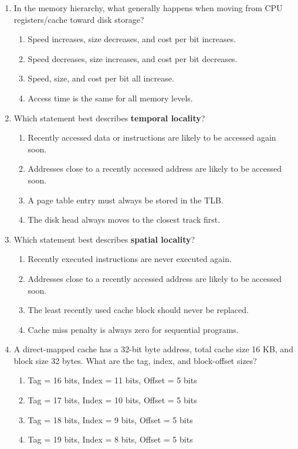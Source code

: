 \documentclass[a4paper,12pt]{article}
\begin{document}
\begin{enumerate}[label=\textbf{\arabic*.}]
    \item In the memory hierarchy, what generally happens when moving from CPU registers/cache toward disk storage?
    \begin{enumerate}[label=\alph*)]
        \item Speed increases, size decreases, and cost per bit increases.
        \item Speed decreases, size increases, and cost per bit decreases.
        \item Speed, size, and cost per bit all increase.
        \item Access time is the same for all memory levels.
    \end{enumerate}

    \item Which statement best describes \textbf{temporal locality}?
    \begin{enumerate}[label=\alph*)]
        \item Recently accessed data or instructions are likely to be accessed again soon.
        \item Addresses close to a recently accessed address are likely to be accessed soon.
        \item A page table entry must always be stored in the TLB.
        \item The disk head always moves to the closest track first.
    \end{enumerate}

    \item Which statement best describes \textbf{spatial locality}?
    \begin{enumerate}[label=\alph*)]
        \item Recently executed instructions are never executed again.
        \item Addresses close to a recently accessed address are likely to be accessed soon.
        \item The least recently used cache block should never be replaced.
        \item Cache miss penalty is always zero for sequential programs.
    \end{enumerate}

    \item A direct-mapped cache has a 32-bit byte address, total cache size 16 KB, and block size 32 bytes. What are the tag, index, and block-offset sizes?
    \begin{enumerate}[label=\alph*)]
        \item Tag = 16 bits, Index = 11 bits, Offset = 5 bits
        \item Tag = 17 bits, Index = 10 bits, Offset = 5 bits
        \item Tag = 18 bits, Index = 9 bits, Offset = 5 bits
        \item Tag = 19 bits, Index = 8 bits, Offset = 5 bits
    \end{enumerate}


\end{enumerate}
\end{document}
